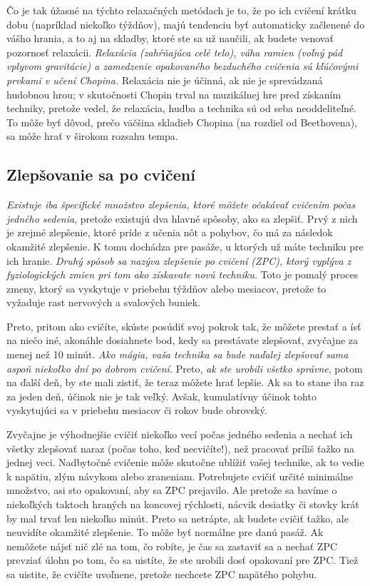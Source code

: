 Čo je tak úžasné na týchto relaxačných metódach je to, že po ich cvičení krátku dobu (napríklad niekoľko týždňov), majú tendenciu byť automaticky začlenené do vášho hrania, a to aj na skladby, ktoré ste sa už naučili, ak budete venovať pozornosť relaxácii. \emph{Relaxácia (zahŕňajúca celé telo), váha ramien (voľný pád vplyvom gravitácie) a zamedzenie opakovaného bezduchého cvičenia sú kľúčovými prvkami v učení Chopina.} Relaxácia nie je účinná, ak nie je sprevádzaná hudobnou hrou; v skutočnosti Chopin trval na muzikálnej hre pred získaním techniky, pretože vedel, že relaxácia, hudba a technika sú od seba neoddeliteľné. To môže byť dôvod, prečo väčšina skladieb Chopina (na rozdiel od Beethovena), sa môže hrať v širokom rozsahu tempa.

\subsection{Zlepšovanie sa po cvičení}
\emph{Existuje iba špecifické množstvo zlepšenia, ktoré môžete očakávať cvičením počas jedného sedenia}, pretože existujú dva hlavné spôsoby, ako sa zlepšiť. Prvý z nich je zrejmé zlepšenie, ktoré príde z učenia nôt a pohybov, čo má za následok okamžité zlepšenie. K tomu dochádza pre pasáže, u ktorých už máte techniku pre ich hranie. \emph{Druhý spôsob sa nazýva zlepšenie po cvičení (ZPC), ktorý vyplýva z fyziologických zmien pri tom ako získavate novú techniku.} Toto je pomalý proces zmeny, ktorý sa vyskytuje v priebehu týždňov alebo mesiacov, pretože to vyžaduje rast nervových a svalových buniek.

Preto, pritom ako cvičíte, skúste posúdiť svoj pokrok tak, že môžete prestať a ísť na niečo iné, akonáhle dosiahnete bod, kedy sa prestávate zlepšovať, zvyčajne za menej než 10 minút. \emph{Ako mágia, vaša technika sa bude naďalej zlepšovať sama aspoň niekoľko dní po dobrom cvičení.} Preto, \textit{ak ste urobili všetko správne}, potom na ďalší deň, by ste mali zistiť, že teraz môžete hrať lepšie. Ak sa to stane iba raz za jeden deň, účinok nie je tak veľký. Avšak, kumulatívny účinok tohto vyskytujúci sa v priebehu mesiacov či rokov bude obrovský.

Zvyčajne je výhodnejšie cvičiť niekoľko vecí počas jedného sedenia a nechať ich všetky zlepšovať naraz (počas toho, keď necvičíte!), než pracovať príliš ťažko na jednej veci. Nadbytočné cvičenie môže skutočne ublížiť vašej technike, ak to vedie k napätiu, zlým návykom alebo zraneniam. Potrebujete cvičiť určité minimálne množstvo, asi sto opakovaní, aby sa ZPC prejavilo. Ale pretože sa bavíme o niekoľkých taktoch hraných na koncovej rýchlosti, nácvik desiatky či stovky krát by mal trvať len niekoľko minút. Preto sa netrápte, ak budete cvičiť ťažko, ale neuvidíte okamžité zlepšenie. To môže byť normálne pre danú pasáž. Ak nemôžete nájsť nič zlé na tom, čo robíte, je čas sa zastaviť sa a nechať ZPC prevziať úlohu po tom, čo sa uistíte, že ste urobili dosť opakovaní pre ZPC. Tiež sa uistite, že cvičíte uvoľnene, pretože nechcete ZPC napätého pohybu.

